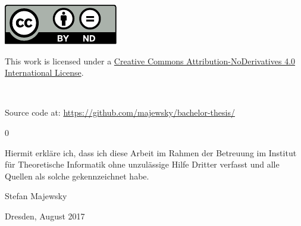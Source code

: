 \documentclass[
 paper=A4,pagesize=automedia,fontsize=11pt,
 BCOR=10mm,DIV=16,
 twoside,headinclude,footinclude=false,
 bibtotocnumbered,          %
 liststotoc,                %
 listsleft,
 pointlessnumbers,          %
 cleardoublepage=empty      %
]{scrbook}
\newcounter{theorem}
\theoremstyle{definition}
\numberwithin{theorem}{chapter}
\numberwithin{equation}{chapter}
\numberwithin{figure}{chapter}
\numberwithin{table}{chapter}
\begin{document}
\begin{titlepage}
 \vspace*{5em}
 \begin{singlespace}
  \hspace{0.18\linewidth}
  \begin{minipage}{0.1\linewidth}
   \includegraphics[width=\linewidth]{img/by-nd.pdf}
  \end{minipage}
  \hspace{0.02\linewidth}
  \begin{minipage}{0.6\linewidth}\footnotesize\flushleft
   This work is licensed under a \href{https://creativecommons.org/licenses/by-nd/4.0/}{Creative Commons Attribution-NoDerivatives 4.0 International License}.
  \end{minipage}\\[-1em]
  \begin{center}\footnotesize
   Source code at: \url{https://github.com/majewsky/bachelor-thesis/}
  \end{center}
 \end{singlespace}
\end{titlepage}

\cleardoublepage
\tableofcontents
\mainmatter





\appendix{}
\renewcommand\thesection{\Alph{section}}
\renewcommand\theequation{\Alph{section}.\arabic{equation}}
\renewcommand\thefigure{\Alph{section}.\arabic{figure}}
\renewcommand\thetable{\Alph{section}.\arabic{table}}
\setcounter{theorem}0
\renewcommand\thetheorem{\Alph{section}.\arabic{theorem}}



\backmatter



\clearpage
\thispagestyle{empty}

\vspace*{1.5em}

Hiermit erkläre ich, dass ich diese Arbeit im Rahmen der Betreuung im Institut
für Theoretische Informatik ohne unzulässige Hilfe Dritter verfasst und alle
Quellen als solche gekennzeichnet habe.

\vspace*{15em}

Stefan Majewsky \par
Dresden, {\color{red}August 2017} %
\end{document}
